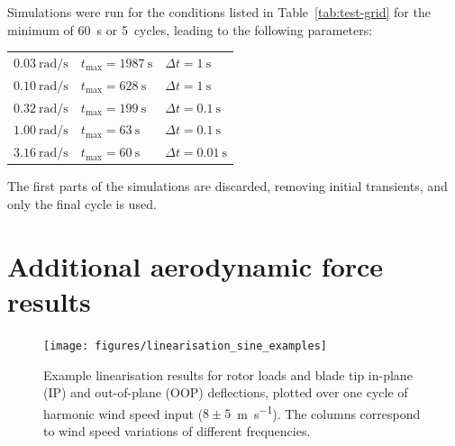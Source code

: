 \documentclass[preprint]{elsarticle}
\newcommand{\mathup}{\mathrm}
\begin{document}
Simulations were run for the conditions listed in Table~\ref{tab:test-grid} for
the minimum of \SI{60}{\second} or \num{5}~cycles, leading to the following
parameters:

{ \centering
  \begin{tabular}{lll}
    $\SI{0.03}{\radian\per\second}$ &
    $t_{\mathup{max}} = \SI{1987}{\second}$ &
    $\Delta t = \SI{1}{\second}$ \\
    $\SI{0.10}{\radian\per\second}$ &
    $t_{\mathup{max}} = \SI{628}{\second}$ &
    $\Delta t = \SI{1}{\second}$ \\
    $\SI{0.32}{\radian\per\second}$ &
    $t_{\mathup{max}} = \SI{199}{\second}$ &
    $\Delta t = \SI{0.1}{\second}$ \\
    $\SI{1.00}{\radian\per\second}$ &
    $t_{\mathup{max}} = \SI{63}{\second}$ &
    $\Delta t = \SI{0.1}{\second}$ \\
    $\SI{3.16}{\radian\per\second}$ &
    $t_{\mathup{max}} = \SI{60}{\second}$ &
    $\Delta t = \SI{0.01}{\second}$ \\
  \end{tabular} \par
}
The first parts of the simulations are discarded, removing initial
transients, and only the final cycle is used. 

\section{Additional aerodynamic force results}
\label{sec:appendix-aero-force}

\begin{figure}
  \centering
  \hspace*{-1.5cm}\texttt{[image: figures/linearisation\_sine\_examples]}
  \caption{Example linearisation results for rotor loads and blade tip
    in-plane (IP) and out-of-plane (OOP) deflections, plotted over one
    cycle of harmonic wind speed input
    ($8\pm5$~\si{\metre\per\second}). The columns correspond to wind
    speed variations of different frequencies.}
\label{fig:hlin-example-sinusoids}
\end{figure}
\end{document}
